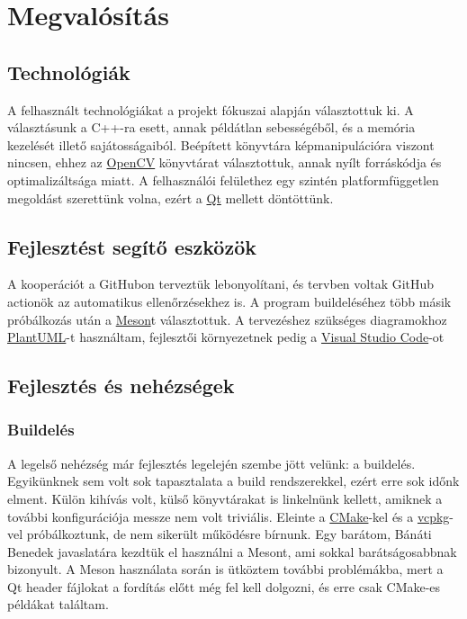 \chapter{Megvalósítás}

\section{Technológiák}

A felhasznált technológiákat a projekt fókuszai alapján választottuk ki. 
A választásunk a C++-ra esett, annak példátlan sebességéből, és a memória kezelését illető sajátosságaiból. Beépített könyvtára képmanipulációra viszont nincsen, ehhez az \href{https://en.wikipedia.org/wiki/OpenCV}{OpenCV} könyvtárat választottuk, annak nyílt forráskódja és optimalizáltsága miatt.
A felhasználói felülethez egy szintén platformfüggetlen megoldást szerettünk volna, ezért a \href{https://en.wikipedia.org/wiki/Qt_(software)}{Qt} mellett döntöttünk. 

\section{Fejlesztést segítő eszközök}

A kooperációt a GitHubon terveztük lebonyolítani, és tervben voltak GitHub actionök az automatikus ellenőrzésekhez is. A program buildeléséhez több másik próbálkozás után a \href{https://en.wikipedia.org/wiki/Meson_(software)}{Meson}t választottuk. A tervezéshez szükséges diagramokhoz \href{https://en.wikipedia.org/wiki/PlantUML}{PlantUML}-t használtam, fejlesztői környezetnek pedig a \href{https://en.wikipedia.org/wiki/Visual_Studio_Code}{Visual Studio Code}-ot

\section{Fejlesztés és nehézségek}

\subsection{Buildelés}

A legelső nehézség már fejlesztés legelején szembe jött velünk: a buildelés. Egyikünknek sem volt sok tapasztalata a build rendszerekkel, ezért erre sok időnk elment. Külön kihívás volt, külső könyvtárakat is linkelnünk kellett, amiknek a további konfigurációja messze nem volt triviális. Eleinte a \href{https://en.wikipedia.org/wiki/CMake}{CMake}-kel és a \href{https://en.wikipedia.org/wiki/Vcpkg}{vcpkg}-vel próbálkoztunk, de nem sikerült működésre bírnunk. Egy barátom, Bánáti Benedek javaslatára kezdtük el használni a Mesont, ami sokkal barátságosabbnak bizonyult. A Meson használata során is ütköztem további problémákba, mert a Qt header fájlokat a fordítás előtt még fel kell dolgozni, és erre csak CMake-es példákat találtam.

